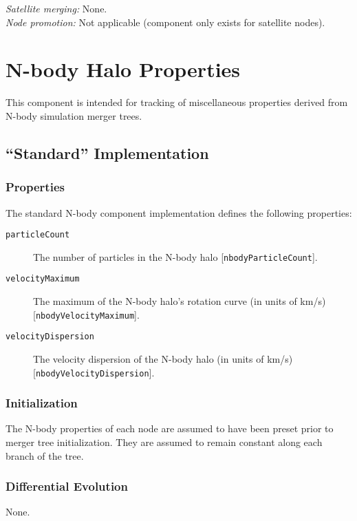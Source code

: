 \noindent\emph{Satellite merging:} None.\\

\noindent\emph{Node promotion:} Not applicable (component only exists for satellite nodes).\\

\section{N-body Halo Properties}

This component is intended for tracking of miscellaneous properties derived from N-body simulation merger trees.

\subsection{``Standard'' Implementation}

\subsubsection{Properties}

The standard N-body component implementation defines the following properties:
\begin{description}
 \item [{\tt particleCount}] The number of particles in the N-body halo [{\tt nbodyParticleCount}].
 \item [{\tt velocityMaximum}] The maximum of the N-body halo's rotation curve (in units of km/s) [{\tt nbodyVelocityMaximum}].
 \item [{\tt velocityDispersion}] The velocity dispersion of the N-body halo (in units of km/s) [{\tt nbodyVelocityDispersion}].
\end{description}

\subsubsection{Initialization}

The N-body properties of each \gls{node} are assumed to have been preset prior to merger tree initialization. They are assumed to remain constant along each branch of the tree.

\subsubsection{Differential Evolution}

None.

